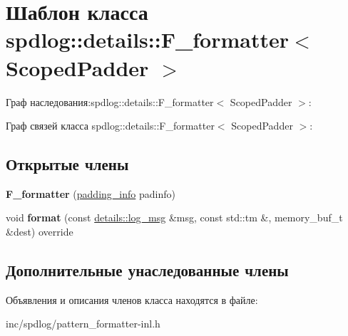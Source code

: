 \hypertarget{classspdlog_1_1details_1_1F__formatter}{}\section{Шаблон класса spdlog\+:\+:details\+:\+:F\+\_\+formatter$<$ Scoped\+Padder $>$}
\label{classspdlog_1_1details_1_1F__formatter}


Граф наследования\+:spdlog\+:\+:details\+:\+:F\+\_\+formatter$<$ Scoped\+Padder $>$\+:


Граф связей класса spdlog\+:\+:details\+:\+:F\+\_\+formatter$<$ Scoped\+Padder $>$\+:
\subsection*{Открытые члены}
\begin{DoxyCompactItemize}
\item 
\mbox{\label{classspdlog_1_1details_1_1F__formatter_a78a85bf33410cebd8bc249a2ad852591}} 
{\bfseries F\+\_\+formatter} (\hyperlink{structspdlog_1_1details_1_1padding__info}{padding\+\_\+info} padinfo)
\item 
\mbox{\label{classspdlog_1_1details_1_1F__formatter_adfaea16432ddff87c52aa6e1a047cc7a}} 
void {\bfseries format} (const \hyperlink{structspdlog_1_1details_1_1log__msg}{details\+::log\+\_\+msg} \&msg, const std\+::tm \&, memory\+\_\+buf\+\_\+t \&dest) override
\end{DoxyCompactItemize}
\subsection*{Дополнительные унаследованные члены}


Объявления и описания членов класса находятся в файле\+:\begin{DoxyCompactItemize}
\item 
inc/spdlog/pattern\+\_\+formatter-\/inl.\+h\end{DoxyCompactItemize}
